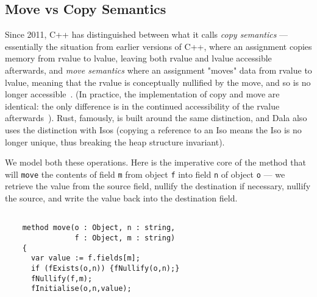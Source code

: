 

\balance

\subsection{Move vs Copy Semantics}

Since 2011, C++ has distinguished between what it calls \textit{copy semantics} --- essentially the situation from earlier versions of C++, where an assignment copies memory from rvalue to lvalue, leaving both rvalue and lvalue accessible afterwards, and \textit{move semantics} where an assignment "moves" data from rvalue to lvalue,  meaning that the rvalue is conceptually nullified by the move, and so is no longer accessible~\cite{Boyland01}. (In practice, the implementation of copy and move are identical: the only difference is in the continued accessibility of the rvalue afterwards~\cite{harms_copying_1991}).
Rust, famously, is built around the same distinction, and Dala also uses the distinction with Isos (copying a reference to an Iso means the Iso is no longer unique, thus breaking the heap structure invariant).

We model both these operations. Here is the imperative core of the method that will \lstinline+move+ the contents of field \lstinline+m+ from object \lstinline+f+ into field \lstinline+n+ of object \lstinline+o+ --- we retrieve the value from the source field, nullify the destination if necessary, nullify the source, and  write the value back into the destination field.

\begin{lstlisting}

    method move(o : Object, n : string,
                f : Object, m : string)
    {
      var value := f.fields[m];
      if (fExists(o,n)) {fNullify(o,n);}
      fNullify(f,m);
      fInitialise(o,n,value);
      
\end{lstlisting}

